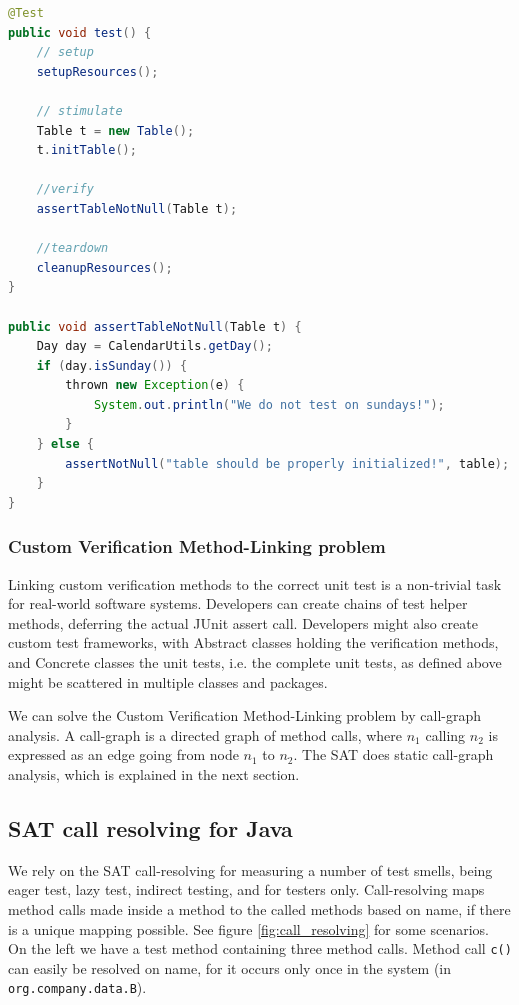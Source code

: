 \documentclass{uvamscse}
\begin{document}
\begin{lstlisting}[language=java, caption=Complexity example of unit test with custom verification method., label=Code_deferredComplexity]
@Test
public void test() {
	// setup 
	setupResources();
	
	// stimulate
	Table t = new Table();
	t.initTable();
	
	//verify
	assertTableNotNull(Table t);
	
	//teardown
	cleanupResources();
}

public void assertTableNotNull(Table t) {
	Day day = CalendarUtils.getDay();
	if (day.isSunday()) {
		thrown new Exception(e) {
			System.out.println("We do not test on sundays!");
		}
	} else {
		assertNotNull("table should be properly initialized!", table);
	}	
} 
\end{lstlisting}

\subsubsection{Custom Verification Method-Linking problem}
Linking custom verification methods to the correct unit test is a non-trivial task for real-world software systems. Developers can create chains of test helper methods, deferring the actual JUnit assert call. Developers might also create custom test frameworks, with Abstract classes holding the verification methods, and Concrete classes the unit tests, i.e. the complete unit tests, as defined above might be scattered in multiple classes and packages. 

We can solve the Custom Verification Method-Linking problem by call-graph analysis. A call-graph is a directed graph of method calls, where $n_1$ calling $n_2$ is expressed as an edge going from node $n_1$ to $n_2$. The SAT does static call-graph analysis, which is explained in the next section.

\subsection{SAT call resolving for Java}
We rely on the SAT call-resolving for measuring a number of test smells, being eager test, lazy test, indirect testing, and for testers only. Call-resolving maps method calls made inside a method to the called methods based on name, if there is a unique mapping possible. See figure \ref{fig:call_resolving} for some scenarios. On the left we have a test method containing three method calls. Method call \texttt{c()} can easily be resolved on name, for it occurs only once in the system (in \texttt{org.company.data.B}).
\end{document}

